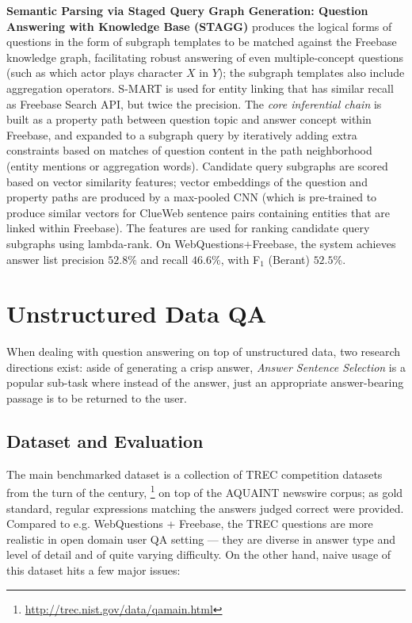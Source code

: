 \textbf{Semantic Parsing via Staged Query Graph Generation: Question Answering with Knowledge Base (STAGG)} \citep{STAGG}
	produces the logical forms of questions in the form of subgraph templates
	to be matched against the Freebase knowledge graph,
	facilitating robust answering of even multiple-concept questions
	(such as which actor plays character $X$ in $Y$);
	the subgraph templates also include aggregation operators.
	S-MART \cite{ELS-MART} is used for entity linking
	that has similar recall as Freebase Search API, but twice the precision.
	The \textit{core inferential chain} is built as a property path
	between question topic and answer concept within Freebase,
	and expanded to a subgraph query by iteratively adding extra
	constraints based on matches of question content in the path
	neighborhood (entity mentions or aggregation words).
	Candidate query subgraphs are scored based on vector similarity
	features; vector embeddings of the question and property paths
	are produced by a max-pooled CNN (which is pre-trained to produce
	similar vectors for ClueWeb sentence pairs containing entities that
	are linked within Freebase).
	The features are used for ranking candidate query subgraphs using lambda-rank.
	On WebQuestions+Freebase, the system achieves answer list
	precision $52.8\%$ and recall $46.6\%$, with F$_1$ (Berant)
	$52.5\%$.



\section{Unstructured Data QA}
\label{sec:unstructured}

When dealing with question answering on top of unstructured data,
two research directions exist: aside of generating a crisp answer,
\textit{Answer Sentence Selection} is a popular sub-task
where instead of the answer, just an appropriate answer-bearing passage
is to be returned to the user.

\subsection{Dataset and Evaluation}

The main benchmarked dataset is a collection of TREC competition datasets
from the turn of the century,%
\footnote{\url{http://trec.nist.gov/data/qamain.html}}
on top of the AQUAINT newswire corpus;
as gold standard,
regular expressions matching the answers judged correct were provided.
Compared to e.g. WebQuestions + Freebase, the TREC questions
are more realistic in open domain user QA setting --- they are diverse
in answer type and level of detail and of quite varying difficulty.
On the other hand, naive usage of this dataset hits a few major issues:

